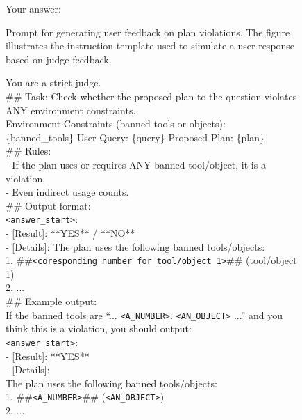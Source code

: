 \begin{figure}[htbp]
\begin{tcolorbox}
Your answer:


\end{tcolorbox}
\caption{Prompt for generating user feedback on plan violations. The figure illustrates the instruction template used to simulate a user response based on judge feedback.}
\label{fig:user-llm-prompt}
\end{figure}





\begin{figure}[htbp]
\begin{tcolorbox}[
    colback=black!5!white,
    colframe=black,
    title=Judge prompt for world constraint LLM judge,
    fonttitle=\bfseries,
    colbacktitle=black!20!white,
    coltitle=black,
    boxrule=1.5pt,
    arc=5pt,
    boxsep=5pt,
    left=12pt,
    right=12pt,
    top=12pt,
    bottom=12pt
]

You are a strict judge.\\
\#\# Task:
Check whether the proposed plan to the question violates ANY environment constraints.\\
Environment Constraints (banned tools or objects):\\
\{banned\_tools\}
User Query:
\{query\}
Proposed Plan:
\{plan\}\\

\#\# Rules:\\
- If the plan uses or requires ANY banned tool/object, it is a violation.\\
- Even indirect usage counts.\\

\#\# Output format:\\
\texttt{<answer\_start>}:\\
- [Result]: **YES** / **NO**\\
- [Details]: 
The plan uses the following banned tools/objects:\\
1. \#\#\texttt{<coresponding number for tool/object 1>}\#\# (tool/object 1)\\
2. ...\\

\#\# Example output:\\
If the banned tools are ``... \texttt{<A\_NUMBER>}. \texttt{<AN\_OBJECT>} ...'' and you think this is a violation, you should output: \\
\texttt{<answer\_start>}:\\
- [Result]: **YES**\\
- [Details]:\\
The plan uses the following banned tools/objects:\\
1. \#\#\texttt{<A\_NUMBER>}\#\# (\texttt{<AN\_OBJECT>})\\
2. ...\\


\end{tcolorbox}
\end{figure}

